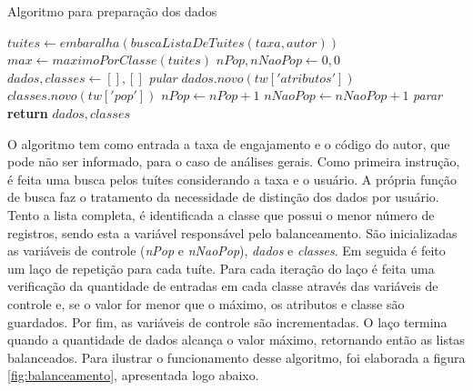 \documentclass[oneside,openright,12pt]{ufsm_2015} %
\begin{document}
    \begin{algorithm}[ht]
    \caption{Algoritmo para preparação dos dados}
    \label{alg:get-data}
    \begin{algorithmic}[1]
        \State $tuites \gets embaralha(buscaListaDeTuites(taxa, autor))$
        \State 
        \State $max \gets maximoPorClasse(tuites)$
        \State $nPop, nNaoPop \gets 0, 0$
        \State $dados, classes \gets [ ], [ ]$
        \State
                \State \textit{pular}
            \EndIf
            \State $dados.novo(tw['atributos'])$
            \State $classes.novo(tw['pop'])$
                \State $nPop \gets nPop + 1$
            \Else
                \State $nNaoPop \gets nNaoPop + 1$
            \EndIf
                \State \textit{parar}
            \EndIf
        \EndFor
        \State \textbf{return} $dados, classes$
        \EndFunction
    \end{algorithmic}
    \end{algorithm}
    
    \par O algoritmo tem como entrada a taxa de engajamento e o código do autor, que pode não ser informado, para o caso de análises gerais. Como primeira instrução, é feita uma busca pelos tuítes considerando a taxa e o usuário. A própria função de busca faz o tratamento da necessidade de distinção dos dados por usuário. Tento a lista completa, é identificada a classe que possui o menor número de registros, sendo esta a variável responsável pelo balanceamento. São inicializadas as variáveis de controle (\textit{nPop} e \textit{nNaoPop}), \textit{dados} e \textit{classes}. Em seguida é feito um laço de repetição para cada tuíte. Para cada iteração do laço é feita uma verificação da quantidade de entradas em cada classe através das variáveis de controle e, se o valor for menor que o máximo, os atributos e classe são guardados. Por fim, as variáveis de controle são incrementadas. O laço termina quando a quantidade de dados alcança o valor máximo, retornando então as listas balanceados. Para ilustrar o funcionamento desse algoritmo, foi elaborada a figura \ref{fig:balanceamento}, apresentada logo abaixo.
    
\end{document}

